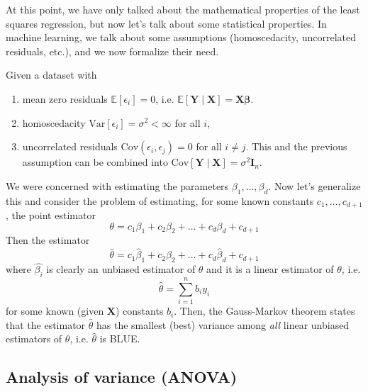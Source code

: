 \documentclass{article}
\begin{document}
    At this point, we have only talked about the mathematical properties of the least squares regression, but now let's talk about some statistical properties. In machine learning, we talk about some assumptions (homoscedacity, uncorrelated residuals, etc.), and we now formalize their need. 

    \begin{theorem}
      Given a dataset with 
      \begin{enumerate}
        \item mean zero residuals $\mathbb{E}[\epsilon_i] = 0$, i.e. $\mathbb{E}[\mathbf{Y} \mid \mathbf{X}] = \mathbf{X} \boldsymbol{\beta}$. 
        \item homoscedacity $\mathrm{Var}[\epsilon_i] = \sigma^2 < \infty$ for all $i$, 
        \item uncorrelated residuals $\mathrm{Cov}(\epsilon_i, \epsilon_j) = 0$ for all $i \neq j$. This and the previous assumption can be combined into $\mathrm{Cov}[\mathbf{Y} \mid \mathbf{X}] = \sigma^2 \mathbf{I}_n$. 
      \end{enumerate}
      We were concerned with estimating the parameters $\beta_1, \ldots, \beta_d$. Now let's generalize this and consider the problem of estimating, for some known constants $c_1, \ldots, c_{d+1}$, the point estimator 
      \begin{equation}
        \theta = c_1 \beta_1 + c_2 \beta_2 + \ldots + c_d \beta_d + c_{d+1}
      \end{equation}
      Then the estimator 
      \begin{equation}
        \hat{\theta} = c_1 \hat{\beta}_1 + c_2 \hat{\beta}_2 + \ldots + c_d \hat{\beta}_d + c_{d+1}
      \end{equation}
      where $\hat{\beta_i}$ is clearly an unbiased estimator of $\theta$ and it is a linear estimator of $\theta$, i.e. 
      \begin{equation}
        \hat{\theta} = \sum_{i=1}^n b_i y_i
      \end{equation}
      for some known (given $\mathbf{X}$) constants $b_i$. Then, the Gauss-Markov theorem states that the estimator $\hat{\theta}$ has the smallest (best) variance among \textit{all} linear unbiased estimators of $\theta$, i.e. $\hat{\theta}$ is BLUE. 
    \end{theorem}

  \subsection{Analysis of variance (ANOVA)}




\end{document}
